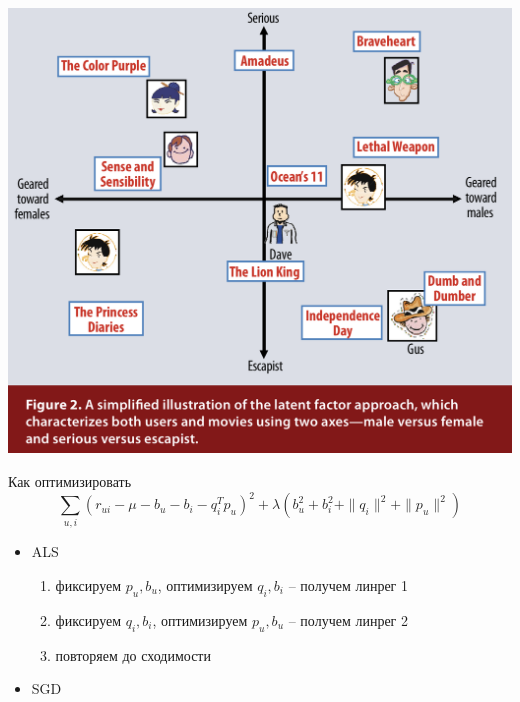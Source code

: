 \documentclass[11pt,aspectratio=169,handout]{beamer}
\begin{document}
\begin{frame}
\begin{center}
\includegraphics[scale=0.3]{images/latent.png}
\end{center}
\end{frame}

\begin{frame}{Как оптимизировать}
\[
\sum_{u, i} (r_{ui} - \mu - b_u - b_i - q_i^T p_u)^2 + \lambda (b_u^2 +  b_i^2 + \| q_i \|^2 + \| p_u \|^2)
\]

\begin{itemize}
\item ALS \cite{IMPLICIT}
\begin{enumerate}
\item фиксируем $p_u, b_u$, оптимизируем $q_i, b_i$ -- получем линрег 1
\item фиксируем  $q_i, b_i$, оптимизируем $p_u, b_u$ -- получем линрег 2
\item повторяем до сходимости
\end{enumerate}
\item SGD
\end{itemize}

\end{frame}
\end{document}
